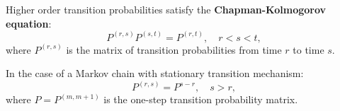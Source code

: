 Higher order transition probabilities satisfy the \textbf{Chapman-Kolmogorov equation}:
$$P^{(r,s)} P^{(s,t)} = P^{(r,t)}, \quad r < s < t,$$
where $P^{(r,s)}$ is the matrix of transition probabilities from time $r$ to time $s$.

In the case of a Markov chain with stationary transition mechanism:
$$P^{(r,s)} = P^{s-r}, \quad s > r,$$
where $P = P^{(m,m+1)}$ is the one-step transition probability matrix.
